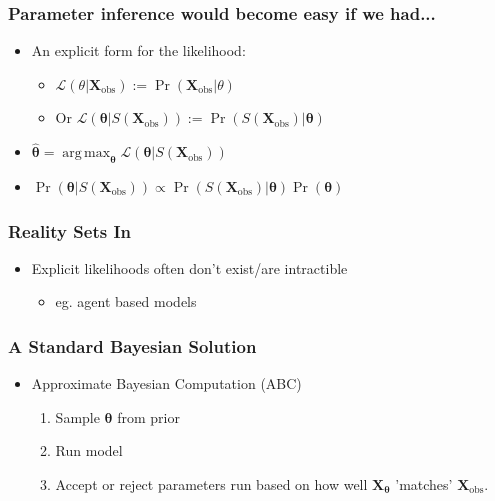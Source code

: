 \documentclass{beamer}
\DeclareMathOperator*{\argmax}{arg\,max}
\begin{document}
\begin{frame}
    \frametitle{Parameter inference would become easy if we had...}
    \begin{itemize}
        \item An explicit form for the likelihood: \begin{itemize}
            \item $\mathcal{L}({\theta}|\mathbf{X}_\text{obs}) := \Pr(\mathbf{X}_\text{obs} | \theta)$
            \item <2-> Or $\mathcal{L}(\bm{\theta}|S(\mathbf{X}_\text{obs})) := \Pr(S(\mathbf{X}_\text{obs}) | \bm\theta)$
        \end{itemize}
        \item <3-> $\hat{\bm{\theta}} = \argmax_{\bm{\theta}} \mathcal{L}(\bm{\theta}|S(\mathbf{X}_\text{obs}))$
        \item <4-> $\Pr(\bm{\theta}|S(\mathbf{X}_\text{obs})) \propto \Pr(S(\mathbf{X}_\text{obs})| \bm\theta)\Pr(\bm{\theta})$
    \end{itemize}
\end{frame}

\begin{frame}
    \frametitle{Reality Sets In}
    \begin{itemize}
        \item Explicit likelihoods often don't exist/are intractible
        \begin{itemize}
            \item eg. agent based models
        \end{itemize}
    \end{itemize}
\end{frame}

\begin{frame}
    \frametitle{A Standard Bayesian Solution}
    \begin{itemize}
        \item Approximate Bayesian Computation (ABC)\begin{enumerate}
                  \item Sample $\bm{\theta}$ from prior
                  \item Run model
                  \item Accept or reject parameters run based on how well $\mathbf{X}_{\bm{\theta}}$ 'matches' $\mathbf{X}_\text{obs}.$
              \end{enumerate}
    \end{itemize}
\end{frame}
\end{document}
